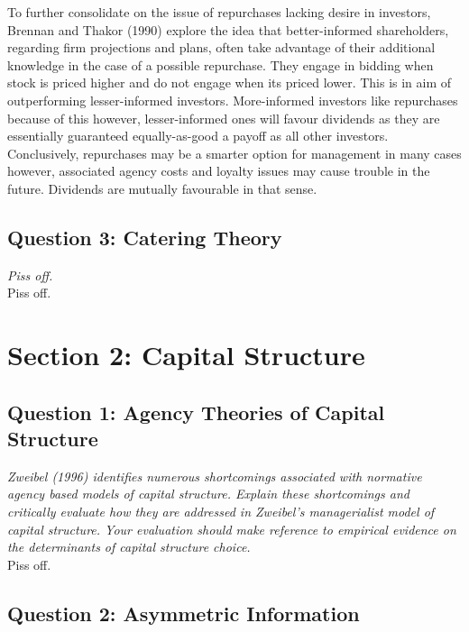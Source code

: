 \documentclass[11pt, english]{article}
\begin{document}
	To further consolidate on the issue of repurchases lacking desire in investors, Brennan and Thakor (1990) explore the idea that better-informed shareholders, regarding firm projections and plans, often take advantage of their additional knowledge in the case of a possible repurchase. They engage in bidding when stock is priced higher and do not engage when its priced lower. This is in aim of outperforming lesser-informed investors. More-informed investors like repurchases because of this however, lesser-informed ones will favour dividends as they are essentially guaranteed equally-as-good a payoff as all other investors. Conclusively, repurchases may be a smarter option for management in many cases however, associated agency costs and loyalty issues may cause trouble in the future. Dividends are mutually favourable in that sense.

	\newpage

	\subsection{Question 3: Catering Theory}

	\textit{Piss off.}\\

	Piss off.
	
\newpage

\section{Section 2: Capital Structure}

	\subsection{Question 1: Agency Theories of Capital Structure}

	\textit{Zweibel (1996) identifies numerous shortcomings associated with normative agency based models of capital structure. Explain these shortcomings and critically evaluate how they are addressed in Zweibel's managerialist model of capital structure. Your evaluation should make reference to empirical evidence on the determinants of capital structure choice.}\\

	Piss off.

	\newpage 

	\subsection{Question 2: Asymmetric Information}
\end{document}
